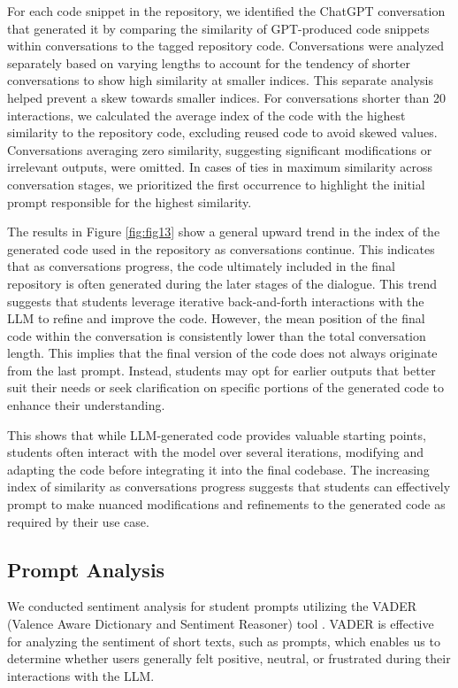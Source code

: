 For each code snippet in the repository, we identified the ChatGPT conversation that generated it by comparing the similarity of GPT-produced code snippets within conversations to the tagged repository code. Conversations were analyzed separately based on varying lengths to account for the tendency of shorter conversations to show high similarity at smaller indices. This separate analysis helped prevent a skew towards smaller indices. For conversations shorter than 20 interactions, we calculated the average index of the code with the highest similarity to the repository code, excluding reused code to avoid skewed values. Conversations averaging zero similarity, suggesting significant modifications or irrelevant outputs, were omitted. In cases of ties in maximum similarity across conversation stages, we prioritized the first occurrence to highlight the initial prompt responsible for the highest similarity.


The results in Figure \ref{fig:fig13} show a general upward trend in the index of the generated code used in the repository as conversations continue. This indicates that as conversations progress, the code ultimately included in the final repository is often generated during the later stages of the dialogue. This trend suggests that students leverage iterative back-and-forth interactions with the LLM to refine and improve the code. However, the mean position of the final code within the conversation is consistently lower than the total conversation length. This implies that the final version of the code does not always originate from the last prompt. Instead, students may opt for earlier outputs that better suit their needs or seek clarification on specific portions of the generated code to enhance their understanding. 

This shows that while LLM-generated code provides valuable starting points, students often interact with the model over several iterations, modifying and adapting the code before integrating it into the final codebase. The increasing index of similarity as conversations progress suggests that students can effectively prompt to make nuanced modifications and refinements to the generated code as required by their use case.


\subsection{Prompt Analysis}
We conducted sentiment analysis for student prompts utilizing the VADER (Valence Aware Dictionary and Sentiment Reasoner) tool \cite{Hutto_Gilbert_2014}. VADER is effective for analyzing the sentiment of short texts, such as prompts, which enables us to determine whether users generally felt positive, neutral, or frustrated during their interactions with the LLM.


